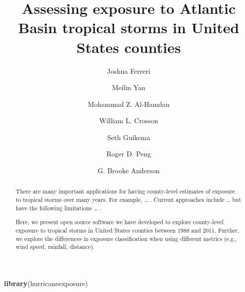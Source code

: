\documentclass[]{elsarticle} %
\newenvironment{Shaded}{\begin{snugshade}}{\end{snugshade}}
\newcommand{\KeywordTok}[1]{\textcolor[rgb]{0.13,0.29,0.53}{\textbf{{#1}}}}
\newcommand{\NormalTok}[1]{{#1}}
\begin{document}
\begin{frontmatter}

  \title{Assessing exposure to Atlantic Basin tropical storms in United States
counties}
    \author[Colorado State University]{Joshua Ferreri}
  
    \author[Colorado State University]{Meilin Yan}
  
    \author[NASA Marshall Space Flight Center]{Mohammad Z. Al-Hamdan}
  
    \author[NASA Marshall Space Flight Center]{William L. Crosson}
  
    \author[University of Michigan]{Seth Guikema}
  
    \author[Johns Hopkins Bloomberg School of Public Health]{Roger D. Peng}
  
    \author[Colorado State University]{G. Brooke Anderson}
      \address[Colorado State University]{Department of Environmental and Radiological Health Sciences, Lake
Street, Fort Collins, CO, Zip}
    \address[NASA Marshall Space Flight Center]{Universities Space Research Association, Street, Huntsville, AL, Zip}
    \address[University of Michigan]{Department, Street, City, State, Zip}
    \address[Johns Hopkins Bloomberg School of Public Health]{Department of Biostatistics, Street, Baltimore, MD, Zip}
  
  \begin{abstract}
  There are many important applications for having county-level estimates
  of exposure to tropical storms over many years. For example, \ldots{} .
  Current approaches include \ldots{} but have the following limitations
  \ldots{} .
  
  Here, we present open source software we have developed to explore
  county-level exposure to tropical storms in United States counties
  between 1988 and 2011. Further, we explore the differences in exposure
  classification when using different metrics (e.g., wind speed, rainfall,
  distance).
  \end{abstract}
  
 \end{frontmatter}

\begin{Shaded}
\begin{Highlighting}[]
\KeywordTok{library}\NormalTok{(hurricaneexposure)}
\end{Highlighting}
\end{Shaded}
\end{document}
